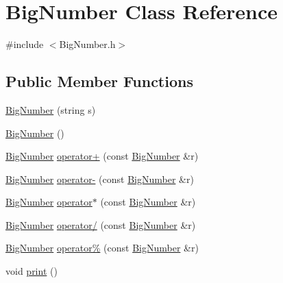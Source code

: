 \hypertarget{class_big_number}{}\section{Big\+Number Class Reference}
\label{class_big_number}


{\ttfamily \#include $<$Big\+Number.\+h$>$}

\subsection*{Public Member Functions}
\begin{DoxyCompactItemize}
\item 
\mbox{\hyperlink{class_big_number_ac6701b663665e17ab6d71df11bc1cc8f}{Big\+Number}} (string s)
\item 
\mbox{\hyperlink{class_big_number_a0d12fbec476322042ba36e61e1b0db82}{Big\+Number}} ()
\item 
\mbox{\hyperlink{class_big_number}{Big\+Number}} \mbox{\hyperlink{class_big_number_a7f0d5c2a04106dd3e68a141ce12de401}{operator+}} (const \mbox{\hyperlink{class_big_number}{Big\+Number}} \&r)
\item 
\mbox{\hyperlink{class_big_number}{Big\+Number}} \mbox{\hyperlink{class_big_number_abfa620773f36a7f2b17b60c2ce764fb5}{operator-\/}} (const \mbox{\hyperlink{class_big_number}{Big\+Number}} \&r)
\item 
\mbox{\hyperlink{class_big_number}{Big\+Number}} \mbox{\hyperlink{class_big_number_a8cadbd12a3a0f1d70295cd90dc531f34}{operator$\ast$}} (const \mbox{\hyperlink{class_big_number}{Big\+Number}} \&r)
\item 
\mbox{\hyperlink{class_big_number}{Big\+Number}} \mbox{\hyperlink{class_big_number_a8efbdb004a3710576a1de72d338ba63a}{operator/}} (const \mbox{\hyperlink{class_big_number}{Big\+Number}} \&r)
\item 
\mbox{\hyperlink{class_big_number}{Big\+Number}} \mbox{\hyperlink{class_big_number_a682eee18133f6bb3dff3147c38e83f30}{operator\%}} (const \mbox{\hyperlink{class_big_number}{Big\+Number}} \&r)
\item 
void \mbox{\hyperlink{class_big_number_a12b0e9ff1459434b916e73468bd41981}{print}} ()
\end{DoxyCompactItemize}
